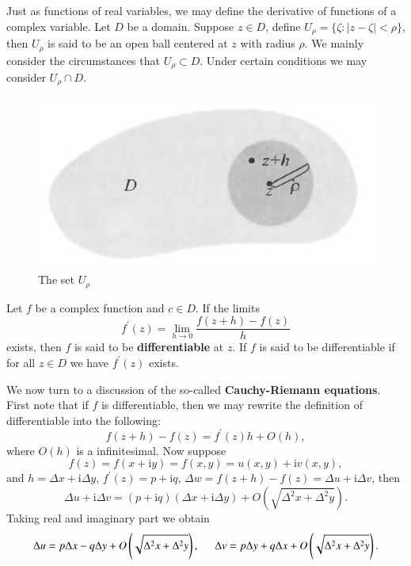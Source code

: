 Just as functions of real variables, we may define the derivative of functions of a complex variable. Let $D$ be a domain. Suppose $z\in D$, define $U_\rho=\{\zeta:|z-\zeta|<\rho\}$, then $U_\rho$ is said to be an open ball centered at $z$ with radius $\rho$. We mainly consider the circumstances that $U_\rho\subset D$. Under certain conditions we may consider $U_\rho\cap D$.
\begin{figure}[htbp]
    \label{1.1.1}
    \center
    \includegraphics[scale=0.39]{Images/neighborhood.png}
    \caption{The set $U_\rho$}
\end{figure}
Let $f$ be a complex function and $c\in D$. If the limits 
$$
f^\prime(z) =\lim_{h\rightarrow 0} \frac{f\left( z+h \right) -f\left( z \right)}{h}
$$
exists, then $f$ is said to be \textbf{differentiable} at $z$. If $f$ is said to be differentiable if for all $z\in D$ we have $f^\prime(z)$ exists.\par
We now turn to a discussion of the so-called \textbf{Cauchy-Riemann equations}. First note that if $f$ is differentiable, then we may rewrite the definition of differentiable into the following: 
$$
f\left( z+h \right) -f\left( z \right) =f^{\prime}\left( z \right) h+O\left( h \right) ,
$$
where $O(h)$ is a infinitesimal. Now suppose
$$
f\left( z \right) =f\left( x+\mathrm{i}y \right) =f\left( x,y \right) =u\left( x,y \right) +\mathrm{i}v\left( x,y \right) ,
$$
and 
$h=\Delta x+\mathrm{i}\Delta y$, $f^\prime(z)=p+\mathrm{i}q$, $\Delta w=f(z+h)-f(z)=\Delta u+\mathrm{i}\Delta v$, then 
$$
\Delta u+\mathrm{i}\Delta v=\left( p+\mathrm{i}q \right) \left( \Delta x+\mathrm{i}\Delta y \right) +O\left( \sqrt{\Delta ^2x+\Delta ^2y} \right) .
$$
Taking real and imaginary part we obtain 
$$
\Delta u=p\Delta x-q\Delta y+O\left( \sqrt{\Delta ^2x+\Delta ^2y} \right) ,\hspace{0.5cm}\Delta v=p\Delta y+q\Delta x+O\left( \sqrt{\Delta ^2x+\Delta ^2y} \right) .
$$
